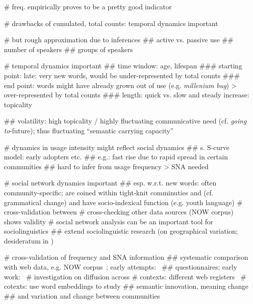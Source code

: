 \documentclass[
  a4paper,
  abstract=on,
  captions=tableabove
  ]{scrartcl}
\begin{document}
    \begin{qitem}
      # freq. empirically proves to be a pretty good indicator

      # drawbacks of cumulated, total counts: temporal dynamics important

      # but rough approximation due to inferences
        ## active vs. passive use
        ## number of speakers
        ## groups of speakers

      # temporal dynamics important
        ## time window: age, lifespan
          ### starting point: late: very new words, would be under-represented by total counts
          ### end point: words might have already grown out of use (e.g. \emph{millenium bug}) > over-represented by total counts
          ### length: quick vs. slow and steady increase: topicality

        ## volatility: high topicality / highly fluctuating communicative need (cf. \emph{going to}-future); thus fluctuating ``semantic carrying capacity''~\parencite{Grieve2018MappingLexical}

        # dynamics in usage intensity might reflect social dynamics
          ## s. S-curve model: early adopters etc.
          ## e.g.: fast rise due to rapid spread in certain communities
          ## hard to infer from usage frequency > SNA needed

      # social network dynamics important
        ## esp. w.r.t. new words: often community-specific; are coined within tight-knit comminuties and (cf. grammatical change) and have socio-indexical function (e.g. youth language)
      # cross-validation between
      # cross-checking other data sources (NOW corpus) shows validity
      # social network analysis can be an important tool for sociolinguistics
        ## extend sociolinguistic research (on geographical variation; desideratum in \cite{Grieve2019MappingLexical})
    \end{qitem}


    \begin{qitem}
      # cross-validation of frequency and SNA information
        ## systematic comparison with web data, e.g. NOW corpus~\parencite{Davies2013CorpusNews}; early attempts:~\cite{Wurschinger2016UsingWeb}
        ## questionnaires; early work:~\cite{Kerremans2015WebNew}
      # investigation on diffusion across
        # contexts: different web registers~\parencite{Biber2016RegisterVariation}
        # cotexts: use word embeddings to study
          ## semantic innovation, meaning change
          ## and variation and change between communities~\parencite{Tredici2019YouShall} 
    \end{qitem}
\end{document}
